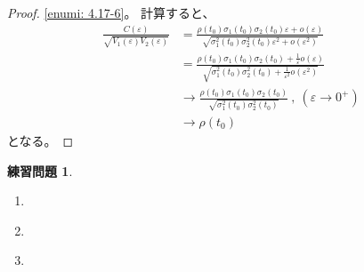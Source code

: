 \documentclass[uplatex]{jsarticle}
\theoremstyle{definition}
\newtheorem{prob}[prob]{練習問題}
\def\ep{\varepsilon}
\begin{document}
\begin{proof}
  \ref{enumi: 4.17-6}。
  計算すると、
  \begin{align*}
    \frac{C(\ep)}{\sqrt{V_1(\ep)V_2(\ep)}}
    &= \frac{\rho(t_0)\sigma_1(t_0)\sigma_2(t_0)\ep + o(\ep)}
    {\sqrt{\sigma_1^2(t_0)\sigma_2^2(t_0)\ep^2 + o(\ep^2)}} \\
    &= \frac{\rho(t_0)\sigma_1(t_0)\sigma_2(t_0) + \frac{1}{\ep}o(\ep)}
    {\sqrt{\sigma_1^2(t_0)\sigma_2^2(t_0) + \frac{1}{\ep^2}o(\ep^2)}} \\
    &\to \frac{\rho(t_0)\sigma_1(t_0)\sigma_2(t_0)}
    {\sqrt{\sigma_1^2(t_0)\sigma_2^2(t_0)}} \ , \ (\ep \to 0^+) \\
    &\to \rho(t_0)
  \end{align*}
  となる。
\end{proof}




\begin{prob}\label{prob: 4.18}
  \begin{enumerate}
    \item \label{enumi : 4.18-1}
    \item \label{enumi : 4.18-2}
    \item \label{enumi : 4.18-3}
  \end{enumerate}
\end{prob}
\end{document}
